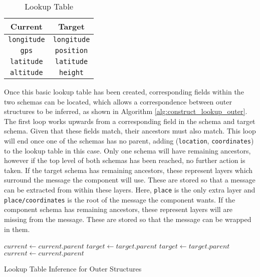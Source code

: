 \documentclass[12pt,twoside,notitlepage]{report}
\begin{document}
\begin{table}[tbh]
\centering

\begin{tabular}{c c}
\hline\hline
Current & Target \\
\hline
{\tt longitude} & {\tt longitude} \\
{\tt gps} & {\tt position} \\
{\tt latitude} & {\tt latitude} \\
{\tt altitude} & {\tt height} \\

\hline
\end{tabular}

\caption{Lookup Table}
\label{tab:lookup_table}
\end{table}

Once this basic lookup table has been created, corresponding fields within the two schemas can be located, which allows a correspondence between outer structures to be inferred, as shown in Algorithm \ref{alg:construct_lookup_outer}. 
The first loop works upwards from a corresponding field in the schema and target schema. 
Given that these fields match, their ancestors must also match. 
This loop will end once one of the schemas has no parent, adding ({\tt location}, {\tt coordinates}) to the lookup table in this case. 
Only one schema will have remaining ancestors, however if the top level of both schemas has been reached, no further action is taken. 
If the target schema has remaining ancestors, these represent layers which surround the message the component will use. 
These are stored so that a message can be extracted from within these layers. 
Here, {\tt place} is the only extra layer and {\tt place/coordinates} is the root of the message the component wants. 
If the component schema has remaining ancestors, these represent layers will are missing from the message. 
These are stored so that the message can be wrapped in them. 

\begin{algorithm}
\algnewcommand{}
\begin{algorithmic}
	\State {}
	\State $current\gets current.parent$
	\State $target\gets target.parent$
\EndWhile
{}
	\State {}
	\State $target\gets target.parent$
\EndWhile
{}
	\State {}
	\State $current\gets current.parent$
\EndWhile
\end{algorithmic}
\caption{Lookup Table Inference for Outer Structures}
\label{alg:construct_lookup_outer}
\end{algorithm} 
\end{document}
